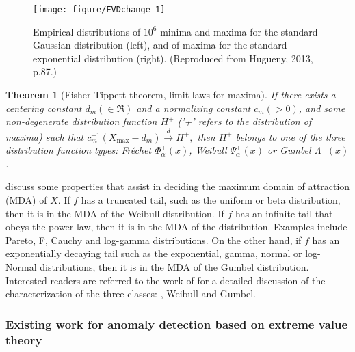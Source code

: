 \documentclass[12pt]{article}
\begin{document}
\begin{figure}[ht]

{\centering \texttt{[image: figure/EVDchange-1]} 

}

\caption{Empirical distributions of $10^6$ minima and maxima for the standard Gaussian distribution (left), and of maxima for the standard exponential distribution (right). (Reproduced from Hugueny, 2013, p.87.)}\label{fig:EVDchange}
\end{figure}

\ifdefined\theorem\else\newtheorem{theorem}{Theorem}\fi
\begin{theorem}[Fisher-Tippett theorem, limit laws for maxima]{\label{thm:fisherTippet}}\hspace{3cm}\newline
If there exists a centering constant $d_{m} (\in\Re)$ and a normalizing constant $c_{m} (>0)$, and some non-degenerate distribution function $H^{+}$ ('+' refers to the distribution of maxima) such that $c_{m}^{-1}(X_{\text{max}}-d_{m}) \stackrel{d}{\longrightarrow} H^{+},$ then $H^{+}$ belongs to one of the three distribution function types: Fr\'echet $\varPhi_{\alpha}^{+}(x)$, Weibull $\varPsi_{\alpha}^{+}(x)$ or Gumbel $\varLambda^{+}(x)$.
\end{theorem}

\citet{embrechts2013modelling} discuss some properties that assist in
deciding the maximum domain of attraction (MDA) of \(X\). If \(f\) has a
truncated tail, such as the uniform or beta distribution, then it is in
the MDA of the Weibull distribution. If \(f\) has an infinite tail that
obeys the power law, then it is in the MDA of the 
distribution. Examples include Pareto, F, Cauchy and log-gamma
distributions. On the other hand, if \(f\) has an exponentially decaying
tail such as the exponential, gamma, normal or log-Normal distributions,
then it is in the MDA of the Gumbel distribution. Interested readers are
referred to the work of \citet{embrechts2013modelling} for a detailed
discussion of the characterization of the three classes:
, Weibull and Gumbel.

\hypertarget{existing-work-for-anomaly-detection-based-on-extreme-value-theory}{%
\subsubsection{Existing work for anomaly detection based on extreme
value
theory}\label{existing-work-for-anomaly-detection-based-on-extreme-value-theory}}
\end{document}
